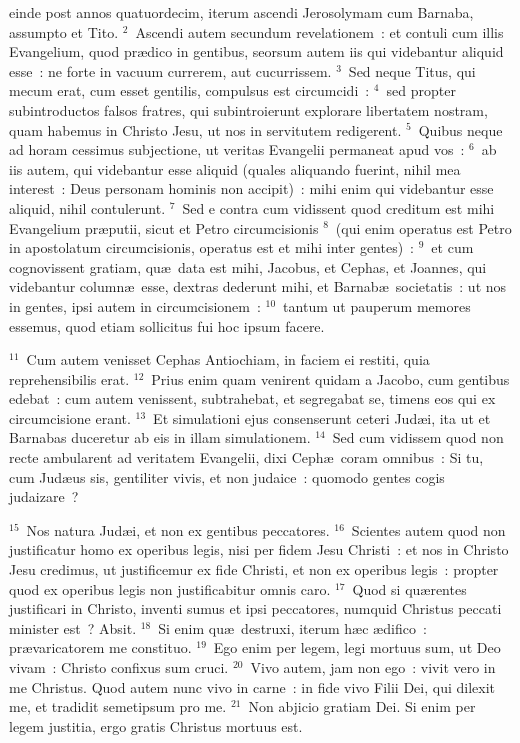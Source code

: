 \bchapter
{}einde post annos quatuordecim, iterum ascendi Jerosolymam cum Barnaba, assumpto et Tito.
${}^{2}$~Ascendi autem secundum revelationem~: et contuli cum illis Evangelium, quod pr\ae dico in gentibus, seorsum autem iis qui videbantur aliquid esse~: ne forte in vacuum currerem, aut cucurrissem.
${}^{3}$~Sed neque Titus, qui mecum erat, cum esset gentilis, compulsus est circumcidi~:
${}^{4}$~sed propter subintroductos falsos fratres, qui subintroierunt explorare libertatem nostram, quam habemus in Christo Jesu, ut nos in servitutem redigerent.
${}^{5}$~Quibus neque ad horam cessimus subjectione, ut veritas Evangelii permaneat apud vos~:
${}^{6}$~ab iis autem, qui videbantur esse aliquid (quales aliquando fuerint, nihil mea interest~: Deus personam hominis non accipit)~: mihi enim qui videbantur esse aliquid, nihil contulerunt.
${}^{7}$~Sed e contra cum vidissent quod creditum est mihi Evangelium pr\ae putii, sicut et Petro circumcisionis
${}^{8}$~(qui enim operatus est Petro in apostolatum circumcisionis, operatus est et mihi inter gentes)~:
${}^{9}$~et cum cognovissent gratiam, qu\ae\ data est mihi, Jacobus, et Cephas, et Joannes, qui videbantur column\ae\ esse, dextras dederunt mihi, et Barnab\ae\ societatis~: ut nos in gentes, ipsi autem in circumcisionem~:
${}^{10}$~tantum ut pauperum memores essemus, quod etiam sollicitus fui hoc ipsum facere.


${}^{11}$~Cum autem venisset Cephas Antiochiam, in faciem ei restiti, quia reprehensibilis erat.
${}^{12}$~Prius enim quam venirent quidam a Jacobo, cum gentibus edebat~: cum autem venissent, subtrahebat, et segregabat se, timens eos qui ex circumcisione erant.
${}^{13}$~Et simulationi ejus consenserunt ceteri Jud\ae i, ita ut et Barnabas duceretur ab eis in illam simulationem.
${}^{14}$~Sed cum vidissem quod non recte ambularent ad veritatem Evangelii, dixi Ceph\ae\ coram omnibus~: Si tu, cum Jud\ae us sis, gentiliter vivis, et non judaice~: quomodo gentes cogis judaizare~?


${}^{15}$~Nos natura Jud\ae i, et non ex gentibus peccatores.
${}^{16}$~Scientes autem quod non justificatur homo ex operibus legis, nisi per fidem Jesu Christi~: et nos in Christo Jesu credimus, ut justificemur ex fide Christi, et non ex operibus legis~: propter quod ex operibus legis non justificabitur omnis caro.
${}^{17}$~Quod si qu\ae rentes justificari in Christo, inventi sumus et ipsi peccatores, numquid Christus peccati minister est~? Absit.
${}^{18}$~Si enim qu\ae\ destruxi, iterum h\ae c \ae difico~: pr\ae varicatorem me constituo.
${}^{19}$~Ego enim per legem, legi mortuus sum, ut Deo vivam~: Christo confixus sum cruci.
${}^{20}$~Vivo autem, jam non ego~: vivit vero in me Christus. Quod autem nunc vivo in carne~: in fide vivo Filii Dei, qui dilexit me, et tradidit semetipsum pro me.
${}^{21}$~Non abjicio gratiam Dei. Si enim per legem justitia, ergo gratis Christus mortuus est.


